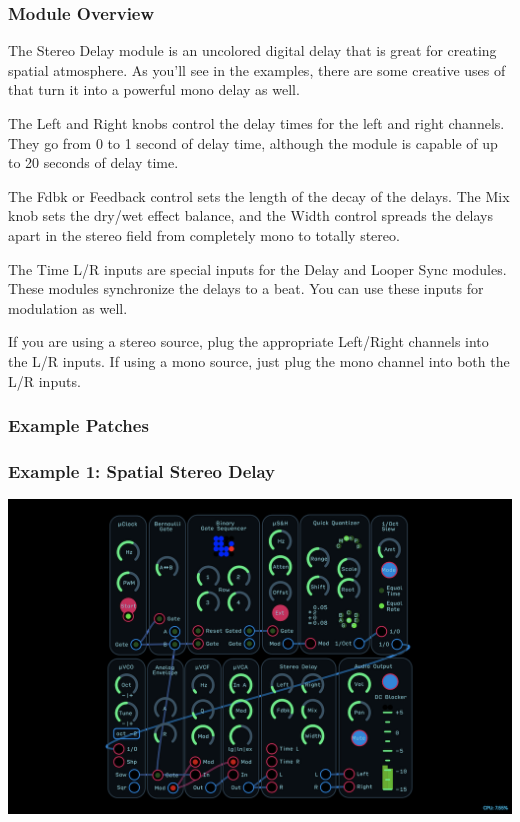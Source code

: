 \documentclass[11pt]{book}
\begin{document}
\pagebreak

\begin{multicols*}{2}

\subsubsection*{Module Overview}

The Stereo Delay module is an uncolored digital delay that is great for creating spatial atmosphere. As you'll see in the examples, there are some creative uses of that turn it into a powerful mono delay as well.

The Left and Right knobs control the delay times for the left and right channels. They go from 0 to 1 second of delay time, although the module is capable of up to 20 seconds of delay time.

The Fdbk or Feedback control sets the length of the decay of the delays. The Mix knob sets the dry/wet effect balance, and the Width control spreads the delays apart in the stereo field from completely mono to totally stereo.

The Time L/R inputs are special inputs for the Delay and Looper Sync modules. These modules synchronize the delays to a beat. You can use these inputs for modulation as well.

If you are using a stereo source, plug the appropriate Left/Right channels into the L/R inputs. If using a mono source, just plug the mono channel into both the L/R inputs.

\subsubsection*{Example Patches}

\subsubsection*{Example 1: Spatial Stereo Delay}

\begin{center}
\includegraphics[width=0.95\linewidth]{stereo-delay-fig1.png}
\end{center}


\end{multicols*}
\end{document}
